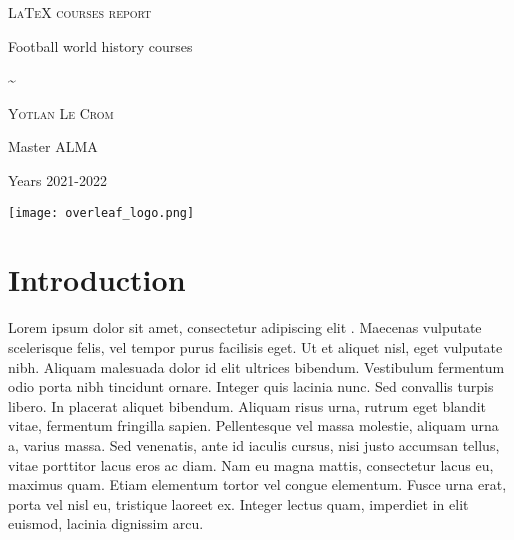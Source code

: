 \documentclass[a4paper,15pt]{article}
\begin{document}

	\begin{titlepage}
		\null	
		\vfill
	
		\centering
		
		
			{\LARGE\scshape LaTeX courses report}

				\vspace{1cm}	
	
			{\Large Football world history courses}

				\vspace{0.75cm}
	
			\textasciitilde
	
				\vspace{0.3cm}

		\begin{center}
		
		
		    {\large\scshape Yotlan Le Crom}

				\vspace{0.5cm}
			
			Master ALMA
			
			Years 2021-2022
		\end{center}
		
		\vspace{1cm}
		
	
		{\centering
			\texttt{[image: overleaf\_logo.png]}
		\par}
	
			\vfill

	\end{titlepage}
	
	\tableofcontents
	
	\setcounter{page}{1}
	\setlength{\parskip}{1em}

\newpage

\section{Introduction}

Lorem ipsum dolor sit amet, consectetur adipiscing elit \cite{source1}. Maecenas vulputate scelerisque felis, vel tempor purus facilisis eget. Ut et aliquet nisl, eget vulputate nibh. Aliquam malesuada dolor id elit ultrices bibendum. Vestibulum fermentum odio porta nibh tincidunt ornare\cite{source2,source3}. Integer quis lacinia nunc. Sed convallis turpis libero. In placerat aliquet bibendum. Aliquam risus urna, rutrum eget blandit vitae, fermentum fringilla sapien. Pellentesque vel massa molestie, aliquam urna a, varius massa. Sed venenatis, ante id iaculis cursus, nisi justo accumsan tellus, vitae porttitor lacus eros ac diam. Nam eu magna mattis, consectetur lacus eu, maximus quam. Etiam elementum tortor vel congue elementum. Fusce urna erat, porta vel nisl eu, tristique laoreet ex. Integer lectus quam, imperdiet in elit euismod, lacinia dignissim arcu.
\end{document}
